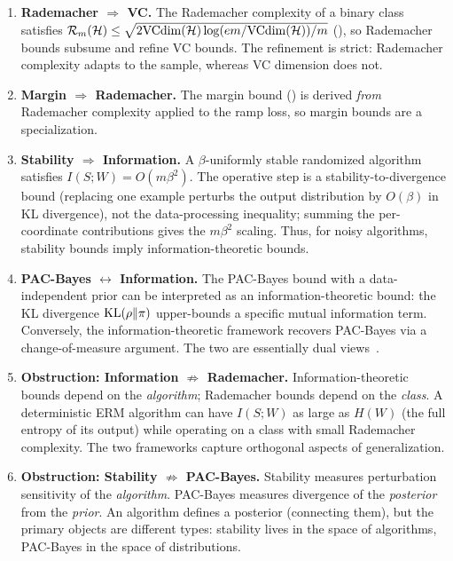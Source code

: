 \begin{enumerate}[leftmargin=*, itemsep=3pt]
\item \textbf{Rademacher $\Rightarrow$ VC.}  The Rademacher complexity of
  a binary class satisfies $\mathcal{R}_m(\mathcal{H}) \leq
  \sqrt{2\mathrm{VCdim}(\mathcal{H}) \log(em/\mathrm{VCdim}(\mathcal{H}))/m}$
  (), so Rademacher bounds subsume and refine VC
  bounds.  The refinement is strict: Rademacher complexity adapts to the
  sample, whereas VC dimension does not.

\item \textbf{Margin $\Rightarrow$ Rademacher.}  The margin bound
  () is derived \emph{from} Rademacher complexity
  applied to the ramp loss, so margin bounds are a specialization.

\item \textbf{Stability $\Rightarrow$ Information.}  A $\beta$-uniformly
  stable randomized algorithm satisfies $I(S; W) = O(m \beta^2)$.  The
  operative step is a stability-to-divergence bound (replacing one example
  perturbs the output distribution by $O(\beta)$ in KL divergence), not the
  data-processing inequality; summing the per-coordinate contributions gives
  the $m\beta^2$ scaling.  Thus, for noisy algorithms, stability bounds imply
  information-theoretic bounds.

\item \textbf{PAC-Bayes $\leftrightarrow$ Information.}  The PAC-Bayes
  bound with a data-independent prior can be interpreted as an
  information-theoretic bound: the KL divergence
  $\mathrm{KL}(\rho \| \pi)$ upper-bounds a specific mutual information
  term.  Conversely, the information-theoretic framework recovers
  PAC-Bayes via a change-of-measure argument.  The two are essentially
  dual views~\cite{HellstromDurisi2020}.

\item \textbf{Obstruction: Information $\not\Rightarrow$ Rademacher.}
  Information-theoretic bounds depend on the \emph{algorithm}; Rademacher
  bounds depend on the \emph{class}.  A deterministic ERM algorithm can have
  $I(S; W)$ as large as $H(W)$ (the full entropy of its output) while
  operating on a class with small Rademacher complexity.  The two frameworks
  capture orthogonal aspects of generalization.

\item \textbf{Obstruction: Stability $\not\Rightarrow$ PAC-Bayes.}
  Stability measures perturbation sensitivity of the \emph{algorithm}.
  PAC-Bayes measures divergence of the \emph{posterior} from the
  \emph{prior}.  An algorithm defines a posterior (connecting them), but
  the primary objects are different types: stability lives in the space of
  algorithms, PAC-Bayes in the space of distributions.
\end{enumerate}


